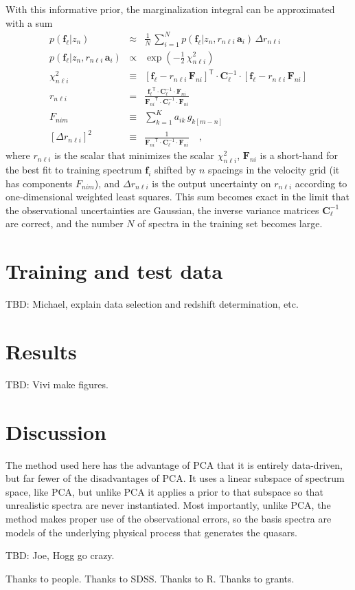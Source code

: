 \documentclass[preprint]{aastex}
\newcommand{\mmatrix}[1]{\boldsymbol{#1}}
\newcommand{\inverse}[1]{{#1}^{-1}}
\newcommand{\transpose}[1]{{#1}^{\mathsf{T}}}
\newcommand{\covar}{\mmatrix{C}}
\newcommand{\avec}{\mmatrix{a}}
\newcommand{\fvec}{\mmatrix{f}}
\newcommand{\Fvec}{\mmatrix{F}}
\newcommand{\invvar}{\inverse{\covar}}
\begin{document}
With this informative prior, the marginalization integral can be
approximated with a sum
\begin{eqnarray}\displaystyle
p(\fvec_\ell|z_n) &\approx& \frac{1}{N}\,\sum_{i=1}^N p(\fvec_\ell|z_n,r_{n\ell i}\,\avec_i)\,\Delta r_{n\ell i} \nonumber\\
p(\fvec_\ell|z_n,r_{n\ell i}\,\avec_i) &\propto& \exp(-\frac{1}{2}\,\chi^2_{n\ell i}) \nonumber\\
\chi^2_{n\ell i} &\equiv& \transpose{[\fvec_\ell - r_{n\ell i}\,\Fvec_{ni}]}\cdot\invvar_\ell\cdot[\fvec_\ell - r_{n\ell i}\,\Fvec_{ni}] \nonumber\\
r_{n\ell i} &=& \frac{\transpose{\fvec_\ell}\cdot\invvar_\ell\cdot\Fvec_{ni}}{\transpose{\Fvec_{ni}}\cdot\invvar_\ell\cdot\Fvec_{ni}} \nonumber\\
F_{nim} &\equiv& \sum_{k=1}^K a_{ik}\,g_{k[m-n]} \nonumber\\
{}[\Delta r_{n\ell i}]^2 &\equiv& \frac{1}{\transpose{\Fvec_{ni}}\cdot\invvar_\ell\cdot\Fvec_{ni}}
\quad ,
\end{eqnarray}
where $r_{n\ell i}$ is the scalar that minimizes the scalar
$\chi^2_{n\ell i}$, $\Fvec_{ni}$ is a short-hand for the best fit to
training spectrum $\fvec_i$ shifted by $n$ spacings in the velocity
grid (it has components $F_{nim}$), and $\Delta r_{n\ell i}$ is the
output uncertainty on $r_{n\ell i}$ according to one-dimensional
weighted least squares.  This sum becomes exact in the limit that the
observational uncertainties are Gaussian, the inverse variance
matrices $\invvar_\ell$ are correct, and the number $N$ of spectra in
the training set becomes large.

\section{Training and test data}

TBD:  Michael, explain data selection and redshift determination, etc.

\section{Results}

TBD:  Vivi make figures.

\section{Discussion}

The method used here has the advantage of PCA that it is entirely
data-driven, but far fewer of the disadvantages of PCA.  It uses a
linear subspace of spectrum space, like PCA, but unlike PCA it applies
a prior to that subspace so that unrealistic spectra are never
instantiated.  Most importantly, unlike PCA, the method makes proper
use of the observational errors, so the basis spectra are models of
the underlying physical process that generates the quasars.

TBD:  Joe, Hogg go crazy.

\acknowledgements
Thanks to people.  Thanks to SDSS.  Thanks to R.  Thanks to grants.
\end{document}
